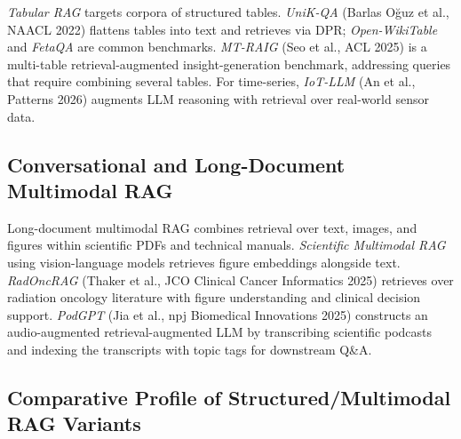 \emph{Tabular RAG} targets corpora of structured tables. \emph{UniK-QA} (Barlas Oğuz et al., NAACL 2022) flattens tables into text and retrieves via DPR; \emph{Open-WikiTable} and \emph{FetaQA} are common benchmarks. \emph{MT-RAIG} (Seo et al., ACL 2025) is a multi-table retrieval-augmented insight-generation benchmark, addressing queries that require combining several tables. For time-series, \emph{IoT-LLM} (An et al., Patterns 2026) augments LLM reasoning with retrieval over real-world sensor data.

\subsection{Conversational and Long-Document Multimodal RAG}\label{conversational-and-long-document-multimodal-rag}

Long-document multimodal RAG combines retrieval over text, images, and figures within scientific PDFs and technical manuals. \emph{Scientific Multimodal RAG} using vision-language models retrieves figure embeddings alongside text. \emph{RadOncRAG} (Thaker et al., JCO Clinical Cancer Informatics 2025) retrieves over radiation oncology literature with figure understanding and clinical decision support. \emph{PodGPT} (Jia et al., npj Biomedical Innovations 2025) constructs an audio-augmented retrieval-augmented LLM by transcribing scientific podcasts and indexing the transcripts with topic tags for downstream Q\&A.

\subsection{Comparative Profile of Structured/Multimodal RAG Variants}\label{comparative-profile-of-structuredmultimodal-rag-variants}

